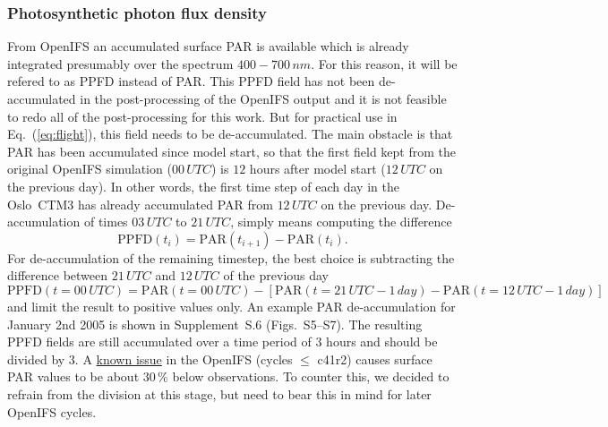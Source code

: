 \documentclass[gmd, manuscript]{copernicus}
\begin{document}
\subsubsection{Photosynthetic photon flux density}
From OpenIFS an accumulated surface PAR is available which is already integrated presumably over the spectrum $400-700\,\unit{nm}$. For this reason, it will be refered to as PPFD instead of PAR. This PPFD field has not been de-accumulated in the post-processing of the OpenIFS output and it is not feasible to redo all of the post-processing for this work. But for practical use in Eq.~(\ref{eq:flight}), this field needs to be de-accumulated. The main obstacle is that PAR has been accumulated since model start, so that the first field kept from the original OpenIFS simulation ($00\,\unit{UTC}$) is $12$ hours after model start ($12\,\unit{UTC}$ on the previous day). In other words, the first time step of each day in the Oslo~CTM3 has already accumulated PAR from $12\,\unit{UTC}$ on the previous day.
De-accumulation of times $03\,\unit{UTC}$ to $21\,\unit{UTC}$, simply means computing the difference
\begin{equation}
  \text{PPFD}(t_i) = \text{PAR}(t_{i+1})-\text{PAR}(t_i).
\end{equation}
For de-accumulation of the remaining timestep, the best choice is subtracting the difference between $21\,\unit{UTC}$ and $12\,\unit{UTC}$ of the previous day
%
\begin{equation}
  \text{PPFD}(t=00\,\unit{UTC}) = \text{PAR}(t=00\,\unit{UTC}) - \left[\text{PAR}(t=21\,\unit{UTC}-1\,\unit{day})-\text{PAR}(t=12\,\unit{UTC}-1\,\unit{day})\right]
\end{equation}
%
and limit the result to positive values only. An example PAR de-accumulation for January 2nd 2005 is shown in Supplement~S.6 (Figs.~S5--S7).
The resulting PPFD fields are still accumulated over a time period of $3$ hours and should be divided by $3$. A \href{https://confluence.ecmwf.int/display/CKB/ERA-Interim\%3A+surface+photosynthetically+active+radiation+\%28surface+PAR\%29+values+are+too+low}{known issue} in the OpenIFS (cycles $\le$ c41r2) causes surface PAR values to be about $30\,\unit{\%}$ below observations. To counter this, we decided to refrain from the division at this stage, but need to bear this in mind for later OpenIFS cycles.
\end{document}
